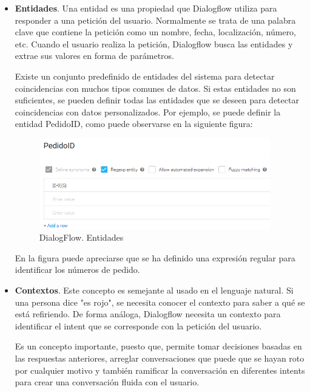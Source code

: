 \begin{itemize}
     \newpage
     
     \item \textbf{Entidades}. Una entidad es una propiedad que Dialogflow utiliza para responder a una petición del usuario. Normalmente se trata de una palabra clave que contiene la petición como un nombre, fecha, localización, número, etc. Cuando el usuario realiza la petición, Dialogflow busca las entidades y extrae sus valores en forma de parámetros.
     
     Existe un conjunto predefinido de entidades del sistema para detectar coincidencias con muchos tipos comunes de datos. Si estas entidades no son suficientes, se pueden definir todas las entidades que se deseen para detectar coincidencias con datos personalizados. Por ejemplo, se puede definir la entidad PedidoID, como puede observarse en la siguiente figura:
     
     \begin{figure}[ht]
         \begin{center}
            \includegraphics[width = 0.95\textwidth]{Figuras/Entidades.PNG}
         \end{center}
         \caption{\label{fig:DialogflowEntities}DialogFlow. Entidades}
     \end{figure}
     
     En la figura puede apreciarse que se ha definido una expresión regular para identificar los números de pedido.
     
     \newpage
     
     \item \textbf{Contextos}. Este concepto es semejante al usado en el lenguaje natural. Si una persona dice "es rojo", se necesita conocer el contexto para saber a qué se está refiriendo. De forma análoga, Dialogflow necesita un contexto para identificar el intent que se corresponde con la petición del usuario.
     
     Es un concepto importante, puesto que, permite tomar decisiones basadas en las respuestas anteriores, arreglar conversaciones que puede que se hayan roto por cualquier motivo y también ramificar la conversación en diferentes intents para crear una conversación fluida con el usuario.
     

\end{itemize}
